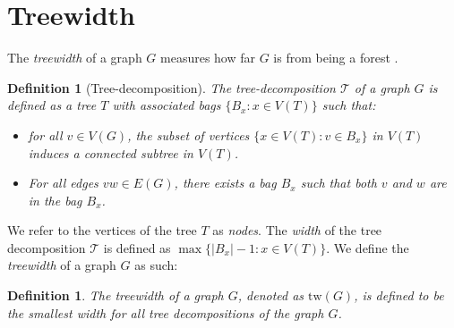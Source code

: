 \documentclass[]{report}
\newcommand{\tree}{\mathcal{T}}
\newcommand{\tw}{\text{tw}}
\newtheorem{definition}[theorem]{Definition}
\theoremstyle{definition}
\numberwithin{theorem}{section}
\numberwithin{equation}{section}
\begin{document}
\section{Treewidth}\label{sec:treewidth}

The \textit{treewidth} of a graph $G$ measures how far $G$ is from being a forest \cite{diestelGraphMinors2017}. 

\begin{definition}[Tree-decomposition]\label{def:tree-decomposition}
	The tree-decomposition $\tree$ of a graph $G$ is defined as a tree $T$ with associated \textit{bags} $\lbrace B_x : x \in V(T) \rbrace$ such that:
	\begin{itemize}
		\item for all $v \in V(G)$, the subset of vertices $\lbrace x \in V(T): v \in B_x \rbrace$ in $V(T)$ induces a connected subtree in $V(T)$.
		\item For all edges $vw \in E(G)$, there exists a bag $B_x$ such that both $v$ and $w$ are in the bag $B_x$.
	\end{itemize}
\end{definition}
We refer to the vertices of the tree $T$ as \textit{nodes}. 
The \textit{width} of the tree decomposition $\tree$ is defined as $\max \lbrace |B_x| - 1 : x \in V(T) \rbrace$. We define the \textit{treewidth} of a graph $G$ as such:


\begin{definition}\label{def:treewidth}
	The treewidth of a graph $G$, denoted as $\tw(G)$, is defined to be the smallest width for all tree decompositions of the graph $G$.
\end{definition}
\end{document}
